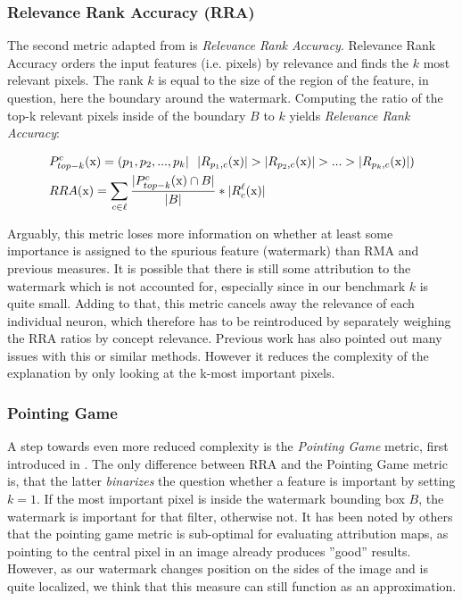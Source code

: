 \subsubsection{Relevance Rank Accuracy (RRA)}
The second metric adapted from \cite{Arras2022} is \textit{Relevance Rank Accuracy}.  
Relevance Rank Accuracy orders the input features (i.e. pixels) by relevance and finds the $k$ most relevant pixels. The rank $k$ is equal to the size of the region of the feature, in question, here the boundary around the watermark. Computing the ratio of the top-k relevant pixels inside of the boundary $B$ to $k$ yields \textit{Relevance Rank Accuracy}:

\begin{align}
& P_{top-k}^{c}(\mathrm{x}) = (p_1, p_2,...,p_k | \ \  |R_{p_1,c}(\mathrm{x})| > |R_{p_2,c}(\mathrm{x})| > ... > |R_{p_k,c}(\mathrm{x})| ) \notag \\
& RRA(\mathrm{x}) = \sum_{c \in \ell} \frac{|P_{top-k}^{c}(\mathrm{x}) \cap B|}{|B|} * |R_c^{\ell}(\mathrm{x})|
\end{align}

Arguably, this metric loses more information on whether at least some importance is assigned to the spurious feature (watermark) than RMA and previous measures. It is possible that there is still some attribution to the watermark which is not accounted for, especially since in our benchmark $k$ is quite small. Adding to that, this metric cancels away the relevance of each individual neuron, which therefore has to be reintroduced by separately weighing the RRA ratios by concept relevance. Previous work has also pointed out many issues with this or similar methods. However it reduces the complexity of the explanation by only looking at the k-most important pixels. \\

\subsubsection{Pointing Game}
A step towards even more reduced complexity is the \textit{Pointing Game} metric, first introduced in \cite{Zhang2016}. The only difference between RRA and the Pointing Game metric is, that the latter \textit{binarizes} the question whether a feature is important by setting $k = 1$. If the most important pixel is inside the watermark bounding box $B$, the watermark is important for that filter, otherwise not.
It has been noted by others that the pointing game metric is sub-optimal for evaluating attribution maps, as pointing to the central pixel in an image already produces ''good'' results. However, as our watermark changes position on the sides of the image and is quite localized, we think that this measure can still function as an approximation. 

